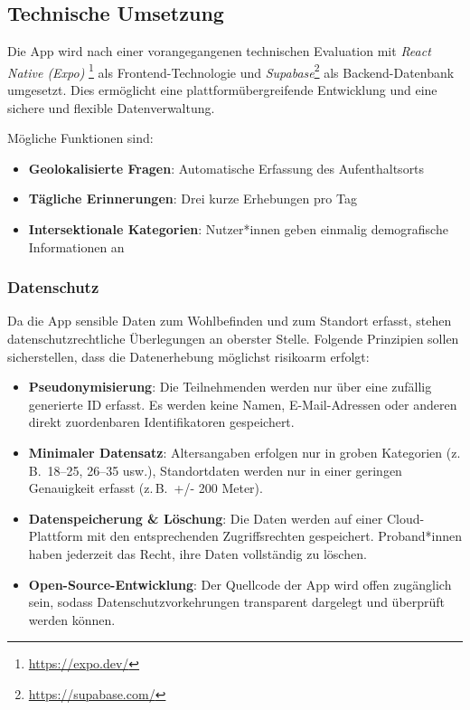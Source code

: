 \documentclass{template}
\begin{document}
\subsection{Technische Umsetzung}
Die App wird nach einer vorangegangenen technischen Evaluation mit \emph{React Native (Expo)} \footnote{\href{https://expo.dev/}{https://expo.dev/}} als Frontend-Technologie und \emph{Supabase}\footnote{\href{https://supabase.com/}{https://supabase.com/}} als Backend-Datenbank umgesetzt. Dies ermöglicht eine plattformübergreifende Entwicklung und eine sichere und flexible Datenverwaltung.

Mögliche Funktionen sind:
\begin{itemize}
    \item \textbf{Geolokalisierte Fragen}: Automatische Erfassung des Aufenthaltsorts
    \item \textbf{Tägliche Erinnerungen}: Drei kurze Erhebungen pro Tag
    \item \textbf{Intersektionale Kategorien}: Nutzer*innen geben einmalig demografische Informationen an
\end{itemize}

\subsubsection{Datenschutz}
Da die App sensible Daten zum Wohlbefinden und zum Standort erfasst, stehen datenschutzrechtliche Überlegungen an oberster Stelle. Folgende Prinzipien sollen sicherstellen, dass die Datenerhebung möglichst risikoarm erfolgt:

\begin{itemize}
    \item \textbf{Pseudonymisierung}: Die Teilnehmenden werden nur über eine zufällig generierte ID erfasst. Es werden keine Namen, E-Mail-Adressen oder anderen direkt zuordenbaren Identifikatoren gespeichert.
    \item \textbf{Minimaler Datensatz}: Altersangaben erfolgen nur in groben Kategorien (z.\,B.\ 18–25, 26–35 usw.), Standortdaten werden nur in einer geringen Genauigkeit erfasst (z.\,B.\ +/- 200 Meter).
    \item \textbf{Datenspeicherung \& Löschung}: Die Daten werden auf einer Cloud-Plattform mit den entsprechenden Zugriffsrechten gespeichert. Proband*innen haben jederzeit das Recht, ihre Daten vollständig zu löschen.
    \item \textbf{Open-Source-Entwicklung}: Der Quellcode der App wird offen zugänglich sein, sodass Datenschutzvorkehrungen transparent dargelegt und überprüft werden können.
\end{itemize}
\end{document}
